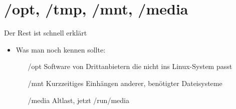 \section[/tmp, /opt …]{/opt, /tmp, /mnt, /media}
\begin{frame}{Der Rest ist schnell erklärt}
\begin{itemize}
\item Was man noch kennen sollte: \\
\begin{itemize}
\item[/opt] Software von Drittanbietern die nicht ins Linux-System passt
\item[/mnt] Kurzzeitiges Einhängen anderer, benötigter Dateisysteme
\item[/media] Altlast, jetzt /run/media
\end{itemize}
\end{itemize}
\end{frame}